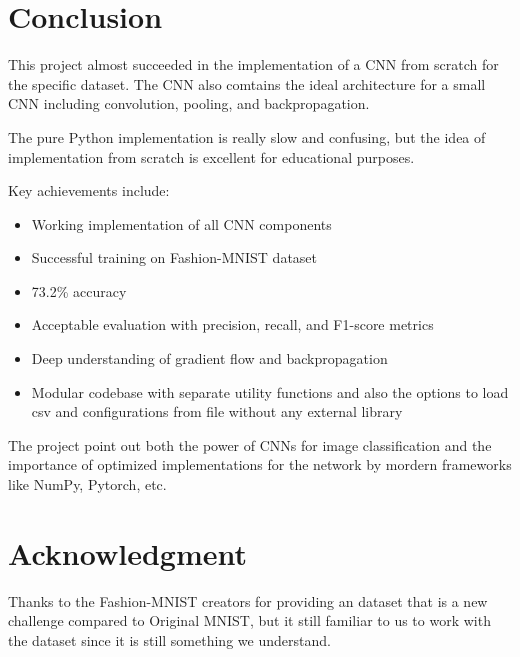\documentclass[conference]{IEEEtran}
\begin{document}
\section{Conclusion}
This project almost succeeded in the implementation of a CNN from scratch for the specific dataset. The CNN also comtains the ideal architecture for a small CNN including convolution, pooling, and backpropagation.

The pure Python implementation is really slow and confusing, but the idea of implementation from scratch is excellent for educational purposes.

Key achievements include:
\begin{itemize}
    \item Working implementation of all CNN components
    \item Successful training on Fashion-MNIST dataset
    \item 73.2\% accuracy
    \item Acceptable evaluation with precision, recall, and F1-score metrics
    \item Deep understanding of gradient flow and backpropagation
    \item Modular codebase with separate utility functions and also the options to load csv and configurations from file without any external library
\end{itemize}

The project point out both the power of CNNs for image classification and the importance of optimized implementations for the network by mordern frameworks like NumPy, Pytorch, etc.


\section*{Acknowledgment}
Thanks to the Fashion-MNIST creators for providing an dataset that is a new challenge compared to Original MNIST, but it still familiar to us to work with the dataset since it is still something we understand.
\end{document}
